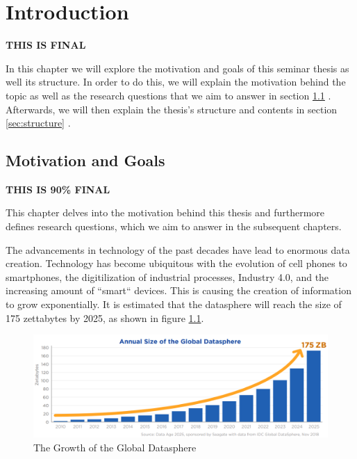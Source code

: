 \chapter{Introduction}
\label{cha:Introduction} %
\textbf{\color{green}THIS IS FINAL}

In this chapter we will explore the motivation and goals of this seminar thesis as well its structure.
In order to do this, we will explain the motivation behind the topic as well as the research questions that we aim to answer in section \ref{sec:motivation-goals} .
Afterwards, we will then explain the thesis's structure and contents in section \ref{sec:structure} .

\section{Motivation and Goals}
\label{sec:motivation-goals}
\textbf{\color{red}THIS IS 90\% FINAL}

This chapter delves into the motivation behind this thesis and furthermore defines research questions, which we aim to answer in the subsequent chapters.

\quad The advancements in technology of the past decades have lead to enormous data creation. Technology has become ubiquitous 
with the evolution of cell phones to smartphones, the digitilization of industrial processes, Industry 4.0,
and the increasing amount of ``smart`` devices. This is causing the creation of information to grow exponentially.
It is estimated that the \gls{datasphere} will reach the size of 175 zettabytes by 2025, as shown in figure \ref{fig:growth_datasphere}.
\begin{figure}[ht]
\centering
\includegraphics[width=1.0\textwidth]{Bilder/size_global_datasphere.png}
\caption{The Growth of the Global Datasphere \cite[p. 6]{idc-seagate-data}}
\label{fig:growth_datasphere}
\end{figure}

